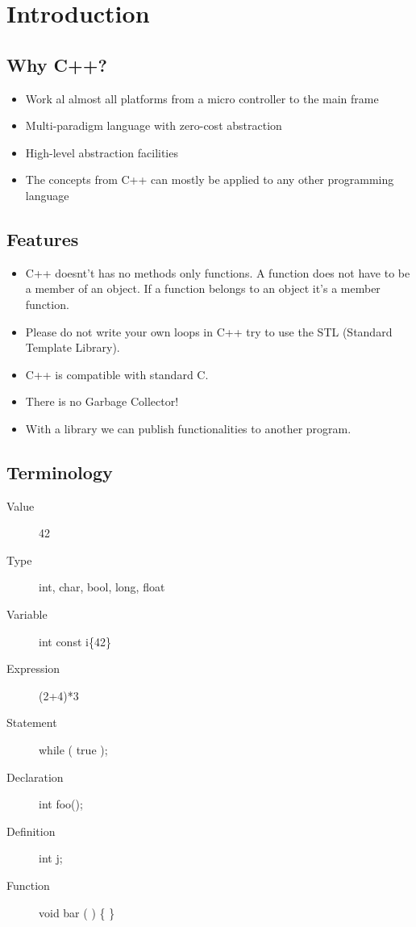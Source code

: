 \tableofcontents
\pagebreak

\section{Introduction}
\subsection{Why C++?}
\begin{itemize}
  \itemsep -0.5em 
  \item Work al almost all platforms from a micro controller to the main frame
  \item Multi-paradigm language with zero-cost abstraction
  \item High-level abstraction facilities
  \item The concepts from C++ can mostly be applied to any other programming language
\end{itemize}

\subsection{Features}
\begin{itemize}
  \itemsep -0.5em 
  \item C++ doesnt't has no methods only functions. A function does not have to be a member of an object. If a function belongs to an object it's a member function.
  \item Please do not write your own loops in C++ try to use the STL (Standard Template Library).
  \item C++ is compatible with standard C.
  \item There is no Garbage Collector!
  \item With a library we can publish functionalities to another program.
\end{itemize}

\subsection{Terminology}
\begin{minipage}{0,5\linewidth}
	\begin{description}
		\item[Value] 42
  		\item[Type] int, char, bool, long, float
  		\item[Variable] int const i\{42\}
  		\item[Expression] (2+4)*3
	\end{description}  
\end{minipage}
\begin{minipage}{0,5\linewidth}
	\begin{description}
   		\item[Statement] while ( true );
  		\item[Declaration] int foo();
  		\item [Definition] int j;
  		\item [Function] void bar ( ) \{ \}
	\end{description}  
\end{minipage}

